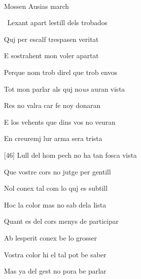 \documentclass[12pt]{article}
\renewcommand{\espaiAbansEtiquetaPoema}{\vspace{0ex}}
\begin{document}
\begin{estrofa}

\espaiAbansEtiquetaPoema

\\

\begin{rubrica}

\textsection{} Mossen Ausias march \textsection{}

\end{rubrica}

\end{estrofa}


\begin{estrofa}

 \textparagraph\  Lexant apart lestill dels trobados

 Quj per escalf trespasen veritat

 E sostrahent mon voler apartat

 Perque nom trob direl que trob envos

 Tot mon parlar als quj no\textit{us} auran vista

 Res no valra car fe noy donaran

 E los vehents que dins vos no veuran

 En creuremj lur arma sera trista

\end{estrofa}



\begin{estrofa}

 [46] Lull del hom pech no ha tan fosca vista

 Que vostre cors no jutge per gentill

 Nol conex tal com lo quj es subtill

 Hoc la color mas no sab dela lista

 Quant es del cors menys de participar

 Ab lesperit conex be lo grosser

 Vostra color hi el tal pot be saber

 Mas ya del gest no pora be parlar

\end{estrofa}
\end{document}
